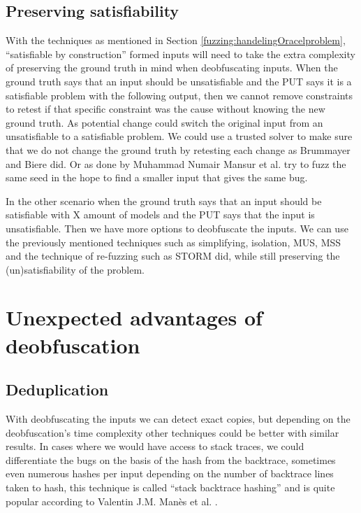 \subsection{Preserving satisfiability}
\label{inputReduction:preservingSat}
With the techniques as mentioned in Section \ref{fuzzing:handelingOracelproblem}, “satisfiable by construction” formed inputs will need to take the extra complexity of preserving the ground truth in mind when deobfuscating inputs. When the ground truth says that an input should be unsatisfiable and the PUT says it is a satisfiable problem with the following output, then we cannot remove constraints to retest if that specific constraint was the cause without knowing the new ground truth. As potential change could switch the original input from an unsatisfiable to a satisfiable problem. We could use a trusted solver to make sure that we do not change the ground truth by retesting each change as Brummayer and Biere \cite{2FuzzingAndDeltaDebuggingSMTSolvers} did.
Or as done by  Muhammad Numair Mansur et al. \cite{1mansur2020detecting} try to fuzz the same seed in the hope to find a smaller input that gives the same bug. 


In the other scenario when the ground truth says that an input should be satisfiable with X amount of models and the PUT says that the input is unsatisfiable. Then we have more options to deobfuscate the inputs. We can use the previously mentioned techniques such as simplifying, isolation, MUS, MSS and the technique of re-fuzzing such as STORM did, while still preserving the (un)satisfiability of the problem.

\section{Unexpected advantages of deobfuscation}
\subsection{Deduplication}
\label{inputReduction:Deduplication}
With deobfuscating the inputs we can detect exact copies, but depending on the deobfuscation’s time complexity other techniques could be better with similar results. In cases where we would have access to stack traces, we could differentiate the bugs on the basis of the hash from the backtrace, sometimes even numerous hashes per input depending on the number of backtrace lines taken to hash, this technique is called “stack backtrace hashing” and is quite popular according to Valentin J.M. Man\`es et al. \cite{13manes2019survey}.

